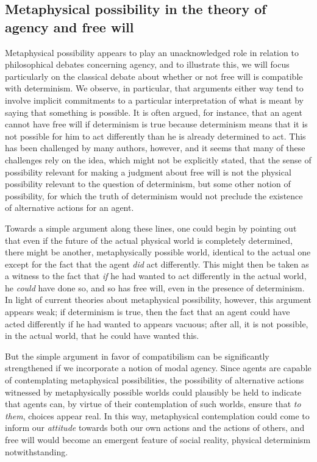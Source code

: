 \documentclass{article}
\begin{document}
\subsection*{Metaphysical possibility in the theory of agency and free will}

Metaphysical possibility appears to play an unacknowledged role in relation to philosophical debates concerning agency, and to illustrate this, we will focus particularly on the classical debate about whether or not free will is compatible with determinism. We observe, in particular, that arguments either way tend to involve implicit commitments to a particular interpretation of what is meant by saying that something is possible. It is often argued, for instance, that an agent cannot have free will if determinism is true because determinism means that it is not possible for him to act differently than he is already determined to act. This has been challenged by many authors, however, and it seems that many of these challenges rely on the idea, which might not be explicitly stated, that the sense of possibility relevant for making a judgment about free will is not the physical possibility relevant to the question of determinism, but some other notion of possibility, for which the truth of determinism would 
not preclude the existence of alternative actions  for an agent.

Towards a simple argument along these lines, one could begin by pointing out that even if the future of the actual physical world is completely determined, there might be another, metaphysically possible world, identical to the actual one except for the fact that the agent \emph{did} act differently. This might then be taken as a witness to the fact that \emph{if} he had wanted to act differently in the actual world, he \emph{could} have done so, and so has free will, even in the presence of determinism. In light of current theories about metaphysical possibility, however, this argument appears weak; if determinism is true, then the fact that an agent could have acted differently if he had wanted to appears vacuous; after all, it is not possible, in the actual world, that he could have wanted this.

But the simple argument in favor of compatibilism can be significantly strengthened if we incorporate a notion of modal agency. Since agents are capable of contemplating metaphysical possibilities, the possibility of alternative actions witnessed by metaphysically possible worlds could plausibly be held to indicate that agents can, by virtue of their contemplation of such worlds, ensure that \emph{to them}, choices appear real. In this way, metaphysical contemplation could come to inform our \emph{attitude} towards both our own actions and the actions of others, and free will would become an emergent feature of social reality, physical determinism notwithstanding.
\end{document}
